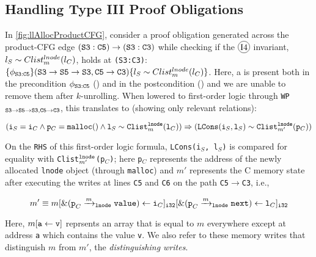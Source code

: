 
\subsection{Handling Type III Proof Obligations}
\label{sec:syn-cat3}

In \cref{fig:llAllocProductCFG}, consider a proof obligation generated
across the product-CFG edge ${\tt (S3:C5) \rightarrow (S3:C3)}$
while checking if the {\small $\circled{I4}$} invariant, $l_{S}\sim{}Clist^{lnode}_{m}(l_{C})$,
holds at {\tt (S3:C3)}:
$\{\phi_{{\tt S3:C5}}\} ({\tt S3\rightarrow S5\rightarrow S3}, {\tt C5\rightarrow C3}) \{l_{S}\sim{}Clist^{lnode}_{m}(l_{C})\}$.
Here, a \recursiveRelation{} is present both in the precondition $\phi_{{\tt S3:C5}}$ ({\small {}})
and in the postcondition ({\small {}}) and we are unable to
remove them after $k$-unrolling.
When lowered to first-order logic
through {\tt WP$_{{\tt S3\rightarrow S5\rightarrow S3},{\tt C5\rightarrow C3}}$}, this translates to (showing only relevant
relations):
\vspace{-5px}
\begin{small}
\begin{equation}\label{eqn:ex1cat3}
({\tt i}_S={\tt i}_C \land {\tt p}_C={\tt malloc()} \land {\tt l}_S \sim{} {\tt Clist}_m^{{\tt lnode}}({\tt l}_C)) \Rightarrow ({\tt LCons}({\tt i}_S, {\tt l}_S) \sim{} {\tt Clist}_{m'}^{{\tt lnode}}({\tt p}_C))
\end{equation}
\end{small}
On the {\tt RHS} of this first-order logic formula, {\tt LCons(i$_S$, l$_S$)} is compared for
equality with {\tt Clist$_{m'}^{{\tt lnode}}$(p$_C$)}; here {\tt p$_C$}
represents the address of the newly allocated {\tt lnode} object (through {\tt malloc}) and $m'$
represents the C memory state after executing the writes at lines
{\tt C5} and {\tt C6} on the path {\tt C5$\rightarrow$C3},
i.e.,
\vspace{-5px}
\begin{small}
\begin{equation}\label{eqn:memstore}
m' \equiv m[{\tt \&(p}_C\xrightarrow[]{m}_{\mathrm{\tt lnode}}{\tt value}) \leftarrow {\tt i}_C]_{\tt i32}[{\tt \&(p}_C\xrightarrow[]{m}_{\mathrm{\tt lnode}}{\tt next}) \leftarrow {\tt l}_C]_{\tt i32}
\end{equation}
\end{small}
Here, $m[{\tt a}\leftarrow{\tt v}]$ reprsents an array that is
equal to $m$ everywhere except at address {\tt a} which contains the value {\tt v}.
We also refer to
these memory writes that distinguish $m$ from $m'$, the {\em distinguishing writes}.

